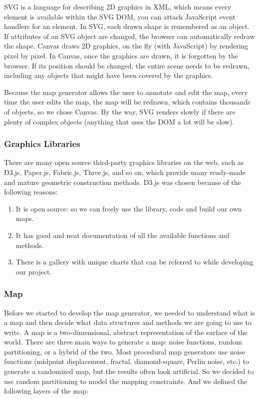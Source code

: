 SVG is a language for describing 2D graphics in XML, which means every element is available within the SVG DOM, you can attach JavaScript event handlers for an element. In SVG, each drawn shape is remembered as an object. If attributes of an SVG object are changed, the browser can automatically redraw the shape. Canvas draws 2D graphics, on the fly (with JavaScript) by rendering pixel by pixel. In Canvas, once the graphics are drawn, it is forgotten by the browser. If its position should be changed, the entire scene needs to be redrawn, including any objects that might have been covered by the graphics.

Because the map generator allows the user to annotate and edit the map, every time the user edits the map, the map will be redrawn, which contains thousands of objects, so we chose Canvas. By the way, SVG renders slowly if there are plenty of complex objects (anything that uses the DOM a lot will be slow).

\subsubsection{Graphics Libraries}
\label{sec:Design>Map Generator Design>Graphics Libraries}
There are many open source third-party graphics libraries on the web, such as D3.js, Paper.js, Fabric.js, Three.js, and so on, which provide many ready-made and mature geometric construction methods. D3.js was chosen because of the following reasons:
\begin{enumerate}
  \item It is open source: so we can freely use the library, code and build our own maps.
  \item It has good and neat documentation of all the available functions and methods.
  \item There is a gallery with unique charts that can be referred to while developing our project.
\end{enumerate}

\subsubsection{Map}
\label{sec:Design>Map Generator Design>Map}
Before we started to develop the map generator, we needed to understand what is a map and then decide what data structures and methods we are going to use to write. A map is a two-dimensional, abstract representation of the surface of the world. There are three main ways to generate a map: noise functions, random partitioning, or a hybrid of the two. Most procedural map generators use noise functions (midpoint displacement, fractal, diamond-square, Perlin noise, etc.) to generate a randomized map, but the results often look artificial. So we decided to use random partitioning to model the mapping constraints. And we defined the following layers of the map:

